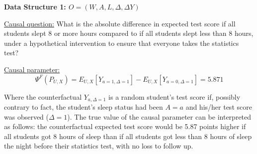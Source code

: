 \documentclass[answers]{exam}
\begin{document}
\pagebreak

\noindent\large\textbf{Data Structure 1: $O = (W, A, L, \Delta, \Delta Y)$}
\normalsize



\noindent \underline{Causal question:} What is the absolute difference in expected test score if all students slept 8 or more hours compared to if all students slept less than 8 hours, under a hypothetical intervention to ensure that everyone takes the statistics test?

\noindent \underline{Causal parameter:}
\[
\Psi^F(P_{U,X}) = E_{U,X}[Y_{a=1, \Delta=1}] - E_{U,X}[Y_{a=0, \Delta=1}] = 5.871
\]

Where the counterfactual $Y_{a,\Delta=1}$ is a random student's test score if, possibly contrary to fact, the student's sleep status had been $A=a$ and his/her test score was observed ($\Delta=1$). The true value of the causal parameter can be interpreted as follows: the counterfactual expected test score would be 5.87 points higher if all students got 8 hours of sleep than if all students got less than 8 hours of sleep the night before their statistics test, with no loss to follow up. 
\end{document}
